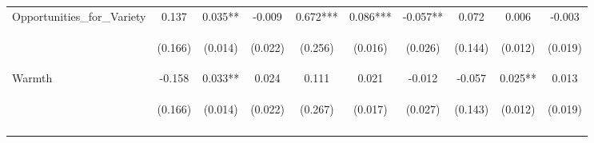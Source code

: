 \begin{tabular}{lccccccccc}
\noalign{\smallskip}Opportunities_for_Variety & 0.137 & 0.035** & -0.009 & 0.672*** & 0.086*** & -0.057** & 0.072 & 0.006 & -0.003\\
 & \begin{footnotesize}(0.166)\end{footnotesize} & \begin{footnotesize}(0.014)\end{footnotesize} & \begin{footnotesize}(0.022)\end{footnotesize} & \begin{footnotesize}(0.256)\end{footnotesize} & \begin{footnotesize}(0.016)\end{footnotesize} & \begin{footnotesize}(0.026)\end{footnotesize} & \begin{footnotesize}(0.144)\end{footnotesize} & \begin{footnotesize}(0.012)\end{footnotesize} & \begin{footnotesize}(0.019)\end{footnotesize}\\
\noalign{\smallskip}Warmth & -0.158 & 0.033** & 0.024 & 0.111 & 0.021 & -0.012 & -0.057 & 0.025** & 0.013\\
 & \begin{footnotesize}(0.166)\end{footnotesize} & \begin{footnotesize}(0.014)\end{footnotesize} & \begin{footnotesize}(0.022)\end{footnotesize} & \begin{footnotesize}(0.267)\end{footnotesize} & \begin{footnotesize}(0.017)\end{footnotesize} & \begin{footnotesize}(0.027)\end{footnotesize} & \begin{footnotesize}(0.143)\end{footnotesize} & \begin{footnotesize}(0.012)\end{footnotesize} & \begin{footnotesize}(0.019)\end{footnotesize}\\
\noalign{\smallskip}\hline\end{tabular}\\
